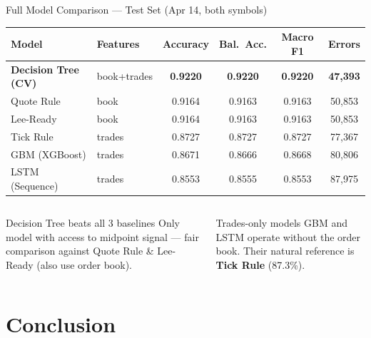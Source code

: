 \documentclass[aspectratio=169,10pt]{beamer}
\begin{document}
\begin{frame}{Full Model Comparison — Test Set (Apr 14, both symbols)}
  \begin{center}
  \renewcommand{\arraystretch}{1.15}
  \begin{tabular}{llcccc}
    \toprule
    \textbf{Model} & \textbf{Features} & \textbf{Accuracy} & \textbf{Bal.\ Acc.} & \textbf{Macro F1} & \textbf{Errors} \\
    \midrule
    \rowcolor{winrow}
    \textbf{Decision Tree (CV)} & book+trades & \textbf{0.9220} & \textbf{0.9220} & \textbf{0.9220} & \textbf{47{,}393} \\
    Quote Rule  & book & 0.9164 & 0.9163 & 0.9163 & 50{,}853 \\
    Lee-Ready   & book & 0.9164 & 0.9163 & 0.9163 & 50{,}853 \\
    Tick Rule   & trades & 0.8727 & 0.8727 & 0.8727 & 77{,}367 \\
    GBM (XGBoost) & trades & 0.8671 & 0.8666 & 0.8668 & 80{,}806 \\
    LSTM (Sequence) & trades & 0.8553 & 0.8555 & 0.8553 & 87{,}975 \\
    \bottomrule
  \end{tabular}
  \end{center}

  \smallskip
  \begin{columns}
    \begin{alertblock}{Decision Tree beats all 3 baselines}
      Only model with access to midpoint signal —
      fair comparison against Quote Rule \& Lee-Ready (also use order book).
    \end{alertblock}

    \begin{block}{Trades-only models}
      GBM and LSTM operate without the order book.
      Their natural reference is \textbf{Tick Rule} (87.3\%).
    \end{block}
  \end{columns}
\end{frame}

\section{Conclusion}
\end{document}
